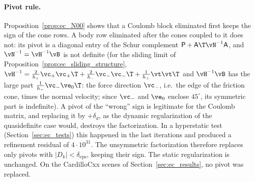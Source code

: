 \paragraph{Pivot rule.} Proposition~\ref{prop:ec_N00} shows that a Coulomb block eliminated first keeps the sign of the cone rows. A body row eliminated after the cones coupled to it does not: its pivot is a diagonal entry of the Schur complement $\mathsf{P} + \mathsf{A}\T\vN^{-1}\mathsf{A}$, and $\vN^{-1} = \vH^{-1}\vB$ is not definite (for the sliding limit of Proposition~\ref{prop:ec_sliding_structure}, $\vH^{-1} = \frac{2}{h_+}\vc_+\vc_+\T + \frac{2}{h_-}\vc_-\vc_-\T + \frac{1}{h_{\perp}}\vt\vt\T$ and $\vH^{-1}\vB$ has the large part $\frac{1}{h_-}\vc_-\ve_0\T$: the force direction $\vc_-$, i.e.\ the edge of the friction cone, times the normal velocity; since $\vc_-$ and $\ve_0$ enclose $45^\circ$, its symmetric part is indefinite). A pivot of the ``wrong'' sign is legitimate for the Coulomb matrix, and replacing it by $+\delta_d$, as the dynamic regularization of the quasidefinite case would, destroys the factorization. In a hyperstatic test (Section~\ref{sec:ec_tests}) this happened in the last iterations and produced a refinement residual of $4 \cdot 10^{31}$. The unsymmetric factorization therefore replaces only pivots with $|D_k| < \delta_{\mathrm{eps}}$, keeping their sign. The static regularization is unchanged. On the CardilloCxx scenes of Section~\ref{sec:ec_results}, no pivot was replaced.
%
